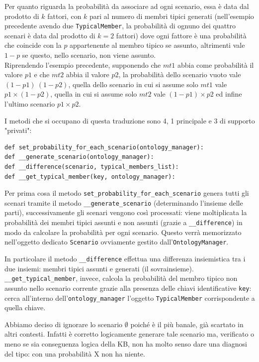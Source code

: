 Per quanto riguarda la probabilità da associare ad ogni scenario, essa è data dal 
prodotto di $ k $ fattori, con $ k $ pari al numero di membri tipici generati (nell’esempio
precedente avendo due \texttt{TypicalMember}, la probabilità di ognuno dei 
quattro scenari è data dal prodotto di $ k = 2 $ fattori) dove ogni fattore è una probabilità 
che coincide con la $ p $ appartenente al membro tipico  se assunto, 
altrimenti vale $ 1 - p $ se questo, nello scenario, non viene assunto.\\
Riprendendo l’esempio precedente, supponendo che $ mt1 $ abbia come probabilità il valore $ p1 $ 
e che $ mt2 $ abbia il valore $ p2 $, la probabilità dello scenario vuoto vale $ ( 1 - p1) \ ( 1 - p2)$,
quella dello scenario in cui si assume solo $ mt1 $ vale $ p1 \times ( 1 - p2) $, 
quella in cui si assume solo $ mt2 $ vale $ ( 1 - p1) \times p2 $ ed infine l’ultimo scenario $ p1 \times p2 $.

I metodi che si occupano di questa traduzione sono 4, 1 principale e 3 di supporto "privati":
\begin{verbatim}
def set_probability_for_each_scenario(ontology_manager):
def __generate_scenario(ontology_manager):
def __difference(scenario, typical_members_list):
def __get_typical_member(key, ontology_manager):
\end{verbatim}
Per prima cosa il metodo \texttt{set_probability_for_each_scenario} 
genera tutti gli scenari tramite il metodo \texttt{__generate_scenario} (determinando
l’insieme delle parti), successivamente gli scenari vengono così processati:
viene moltiplicata la probabilità dei membri tipici assunti e non assunti 
(grazie a \texttt{__difference}) in modo da calcolare la probabilità per ogni scenario.
Questo verrà memorizzato nell'oggetto dedicato \texttt{Scenario}
 ovviamente gestito dall'\texttt{OntologyManager}.

In particolare il metodo \texttt{__difference} effettua una 
differenza insiemistica tra i due insiemi: membri tipici assunti e generati (il sovrainsieme).\\ 
\texttt{__get_typical_member}, invece, calcola la probabilità del membro tipico non assunto
nello scenario corrente grazie alla presenza delle chiavi identificative \texttt{key}:
cerca all'interno dell'\texttt{ontology_manager} l’oggetto \texttt{TypicalMember} corrispondente a quella chiave.

Abbiamo deciso di ignorare lo scenario $ \emptyset $ poiché è il più banale, già scartato in altri contesti.
Infatti è corretto logicamente generare tale scenario ma, verificato o meno se sia conseguenza logica della KB,
non ha molto senso dare una diagnosi del tipo: con una probabilità X non ha niente.

